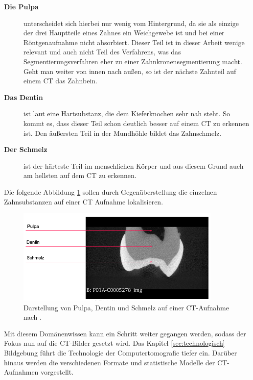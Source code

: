 \begin{description}
	\item[\textbf{Die Pulpa}] unterscheidet sich hierbei nur wenig vom Hintergrund,
		da sie als einzige der drei Hauptteile eines Zahnes ein Weichgewebe ist und
		bei einer Röntgenaufnahme nicht absorbiert. Dieser Teil ist in dieser Arbeit
		wenige relevant und auch nicht Teil des Verfahrens, was das
		Segmentierungsverfahren eher zu einer Zahnkronensegmentierung macht. Geht man
		weiter von innen nach außen, so ist der nächste Zahnteil auf einem CT das
		Zahnbein.

	\item[\textbf{Das Dentin}] ist laut \citet[Seite 41]{lehmann2012Zahnheilkunde}
		eine Hartsubstanz, die dem Kieferknochen sehr nah steht. So kommt es, dass
		dieser Teil schon deutlich besser auf einem CT zu erkennen ist. Den äußersten
		Teil in der Mundhöhle bildet das Zahnschmelz.

	\item[\textbf{Der Schmelz}] ist der härteste Teil im menschlichen Körper und aus
		diesem Grund auch am hellsten auf dem CT zu erkennen.
\end{description}

Die folgende Abbildung \ref{fig:pulpa_dentin_schmelz} sollen durch
Gegenüberstellung die einzelnen Zahnsubstanzen auf einer CT Aufnahme
lokalisieren.

\begin{figure}[h]
	\centering
	\includegraphics[width=0.9\textwidth]{img/dentin_schmelz_pulpa.png}
	\caption{Darstellung von Pulpa, Dentin und Schmelz auf einer CT-Aufnahme nach \citet{heck2024}.}
	\label{fig:pulpa_dentin_schmelz}
\end{figure}

Mit diesem Domänenwissen kann ein Schritt weiter gegangen werden, sodass der
Fokus nun auf die CT-Bilder gesetzt wird. Das Kapitel \ref{sec:technologisch} Bildgebung
führt die Technologie der Computertomografie tiefer ein. Darüber hinaus werden
die verschiedenen Formate und statistische Modelle der CT-Aufnahmen vorgestellt.

